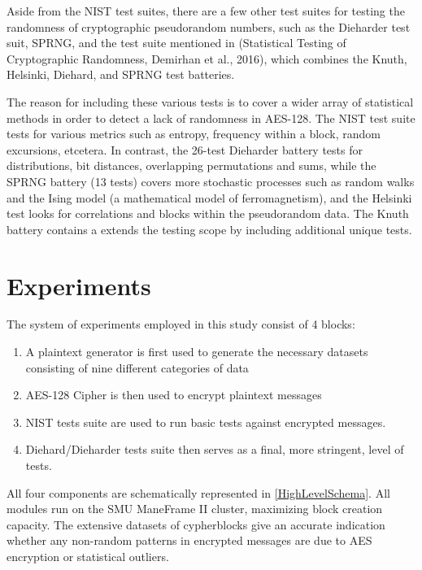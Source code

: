 \documentclass[conference]{IEEEtran}
\begin{document}
Aside from the NIST test suites, there are a few other test suites for testing the randomness of cryptographic pseudorandom numbers, such as the Dieharder test suit, SPRNG, and the test suite mentioned in  (Statistical Testing of Cryptographic Randomness, Demirhan et al., 2016), which combines the Knuth, Helsinki, Diehard, and SPRNG test batteries.

The reason for including these various tests is to cover a wider array of statistical methods in order to detect a lack of randomness in AES-128. The NIST test suite tests for various metrics such as entropy, frequency within a block, random excursions, etcetera. In contrast, the 26-test Dieharder battery tests for distributions, bit distances, overlapping permutations and sums, while the SPRNG battery (13 tests) covers more stochastic processes such as random walks and the Ising model (a
mathematical model of ferromagnetism), and the Helsinki test looks for correlations and blocks within the pseudorandom data. The Knuth battery contains a extends the testing scope by including additional unique tests. 

\section{Experiments}

The system of experiments employed in this study consist of 4 blocks:

\begin{enumerate}
  \item A plaintext generator is first used to  generate the necessary datasets consisting of nine different categories of data
  \item AES-128 Cipher  is then used  to encrypt plaintext messages
  \item NIST tests suite are used to run basic tests against encrypted messages.
  \item Diehard/Dieharder tests suite then serves as a final, more stringent, level of tests. 
\end{enumerate}

All four components are schematically represented in \autoref{HighLevelSchema}. All modules run on the SMU ManeFrame II cluster, maximizing block creation capacity. The extensive datasets of cypherblocks give an accurate indication whether any non-random patterns in encrypted messages are due to AES encryption or statistical outliers.
\end{document}
